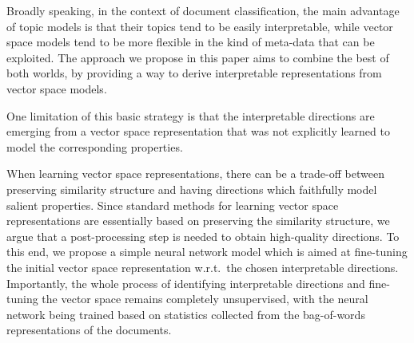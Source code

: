 Broadly speaking, in the context of document classification, the main advantage of topic models is that their topics tend to be easily interpretable, while vector space models tend to be more flexible in the kind of meta-data that can be exploited. The approach we propose in this paper aims to combine the best of both worlds, by providing a way to derive interpretable representations from vector space models.


One limitation of this basic strategy is that the interpretable directions are emerging from a vector space representation that was not explicitly learned to model the corresponding properties.

When learning vector space representations, there can be a trade-off between preserving similarity structure and having directions which faithfully model salient properties. Since standard methods for learning vector space representations are essentially based on preserving the similarity structure, we argue that a post-processing step is needed to obtain high-quality directions. To this end, we propose a simple neural network model which is aimed at fine-tuning the initial vector space representation w.r.t.\ the chosen interpretable directions. Importantly, the whole process of identifying interpretable directions and fine-tuning the vector space remains completely unsupervised, with the neural network being trained based on statistics collected from the bag-of-words representations of the documents. 

